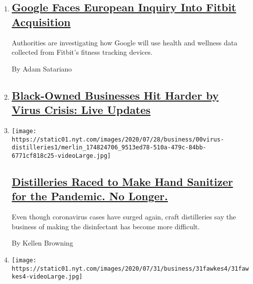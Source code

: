 \begin{enumerate}
\def\labelenumi{\arabic{enumi}.}
\item
  \hypertarget{google-faces-european-inquiry-into-fitbit-acquisition}{%
  \subsection{\texorpdfstring{\href{/2020/08/04/business/google-fitbit-europe.html}{Google
  Faces European Inquiry Into Fitbit
  Acquisition}}{Google Faces European Inquiry Into Fitbit Acquisition}}\label{google-faces-european-inquiry-into-fitbit-acquisition}}

  Authorities are investigating how Google will use health and wellness
  data collected from Fitbit's fitness tracking devices.

  By Adam Satariano
\item
  \hypertarget{black-owned-businesses-hit-harder-by-virus-crisis-live-updates}{%
  \subsection{\texorpdfstring{\href{https://www.nytimes.com/live/2020/08/04/business/stock-market-today-coronavirus}{Black-Owned
  Businesses Hit Harder by Virus Crisis: Live
  Updates}}{Black-Owned Businesses Hit Harder by Virus Crisis: Live Updates}}\label{black-owned-businesses-hit-harder-by-virus-crisis-live-updates}}
\item
  \texttt{[image: https://static01.nyt.com/images/2020/07/28/business/00virus-distilleries1/merlin\_174824706\_9513ed78-510a-479c-84bb-6771cf818c25-videoLarge.jpg]}

  \hypertarget{distilleries-raced-to-make-hand-sanitizer-for-the-pandemic-no-longer}{%
  \subsection{\texorpdfstring{\href{/2020/08/04/business/distilleries-hand-sanitizer-pandemic.html}{Distilleries
  Raced to Make Hand Sanitizer for the Pandemic. No
  Longer.}}{Distilleries Raced to Make Hand Sanitizer for the Pandemic. No Longer.}}\label{distilleries-raced-to-make-hand-sanitizer-for-the-pandemic-no-longer}}

  Even though coronavirus cases have surged again, craft distilleries
  say the business of making the disinfectant has become more difficult.

  By Kellen Browning
\item
  \texttt{[image: https://static01.nyt.com/images/2020/07/31/business/31fawkes4/31fawkes4-videoLarge.jpg]}


\end{enumerate}
